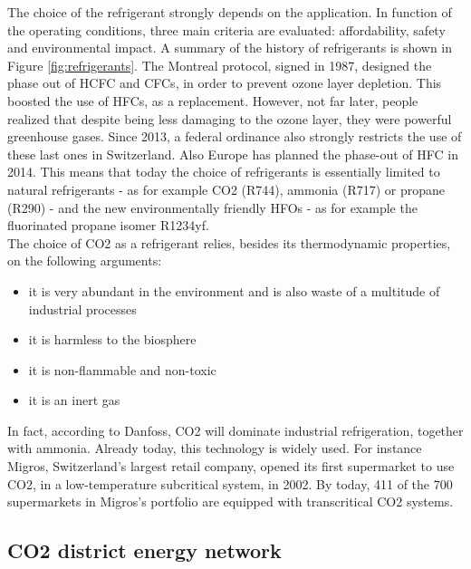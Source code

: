 \documentclass{article}
\begin{document}
The choice of the refrigerant strongly depends on the application. In function of the operating conditions, three main criteria are evaluated: affordability, safety and environmental impact.
A summary of the history of refrigerants is shown in Figure \ref{fig:refrigerants}.
The Montreal protocol, signed in 1987, designed the phase out of HCFC and CFCs, in order to prevent ozone layer depletion. This boosted the use of HFCs, as a replacement. However, not far later, people realized that despite being less damaging to the ozone layer, they were powerful greenhouse gases. Since 2013, a federal ordinance also strongly restricts the use of these last ones in Switzerland\cite{hydrocarbons21.comSwitzerlandIntroduceHFC}. Also Europe has planned the phase-out of HFC in 2014\cite{europeancommissionforclimateactionEULegislationControl2016}. This means that today the choice of refrigerants is essentially limited to natural refrigerants - as for example CO2 (R744), ammonia (R717) or propane (R290) - and the new environmentally friendly HFOs - as for example the fluorinated propane isomer R1234yf.\\

The choice of CO2 as a refrigerant relies, besides its thermodynamic properties, on the following arguments\cite{cavalliniPROPERTIESCO2REFRIGERANT}:
\begin{itemize}
	\item it is very abundant in the environment and is also waste of a multitude of industrial processes
	\item it is harmless to the biosphere
	\item it is non-flammable and non-toxic
	\item it is an inert gas
\end{itemize}

In fact, according to Danfoss\cite{danfossRefrigerantOptionsNow2017}, CO2 will dominate industrial refrigeration, together with ammonia. Already today, this technology is widely used. For instance Migros, Switzerland's largest retail company, opened its first supermarket to use CO2, in a low-temperature subcritical system, in 2002. By today, 411 of the 700 supermarkets in Migros’s portfolio are equipped with transcritical CO2 systems\cite{williamsMigrosDNA2018}.


\subsection{CO2 district energy network}
\end{document}
